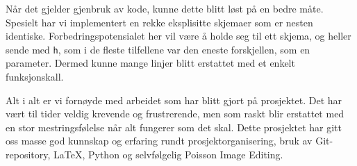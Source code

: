 Når det gjelder gjenbruk av kode, kunne dette blitt løst på en bedre måte. Spesielt har vi implementert en rekke eksplisitte skjemaer som er nesten identiske. Forbedringspotensialet her vil være å holde seg til ett skjema, og heller sende med \texttt{h}, som i de fleste tilfellene var den eneste forskjellen, som en parameter. Dermed kunne mange linjer blitt erstattet med et enkelt funksjonskall. 

Alt i alt er vi fornøyde med arbeidet som har blitt gjort på prosjektet. Det har vært til tider veldig krevende og frustrerende, men som raskt blir erstattet med en stor mestringsfølelse når alt fungerer som det skal. Dette prosjektet har gitt oss masse god kunnskap og erfaring rundt prosjektorganisering, bruk av Git-repository, \LaTeX, Python og selvfølgelig Poisson Image Editing.